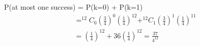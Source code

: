 \documentclass[journal,12pt,twocolumn]{IEEEtran}
\begin{document}
\begin{center}
\end{center}
P(at most one success) = P(k=0) + P(k=1)
\begin{align}
&= ^{12}C_0 \left({\frac{3}{4}}\right)^0 \left(\frac{1}{4}\right)^{12} + ^{12}C_1 \left(\frac{3}{4}\right)^1 \left(\frac{1}{4}\right)^{11} 
\\
&= \left(\frac{1}{4}\right)^{12} + 36\left(\frac{1}{4}\right)^{12} =  \frac{37}{4^{12}}
\end{align}
\end{document}
